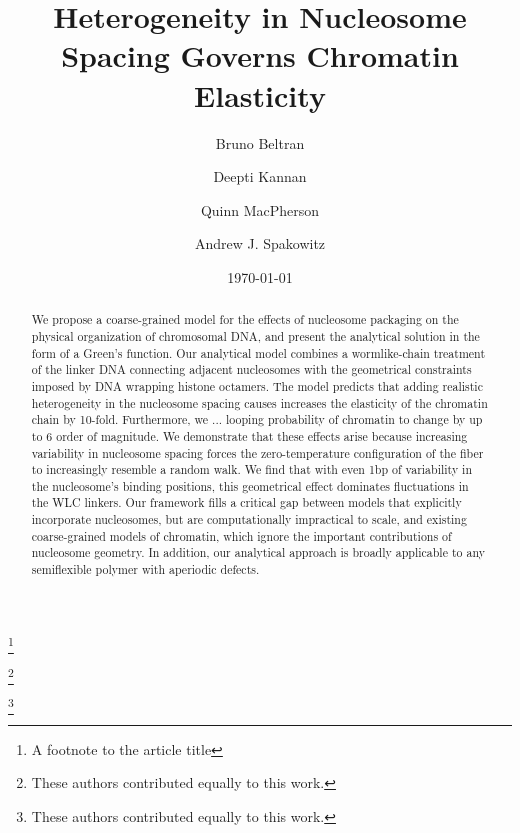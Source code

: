 \documentclass[%
 reprint,
superscriptaddress,
showpacs,preprintnumbers,
 amsmath,amssymb,
 aps,
 prl,
]{revtex4-1}
\begin{document}

\title{Heterogeneity in Nucleosome Spacing Governs Chromatin Elasticity}%
\thanks{A footnote to the article title}%

\author{Bruno Beltran}
\thanks{These authors contributed equally to this work.}%
%
\author{Deepti Kannan}%
\thanks{These authors contributed equally to this work.}%
\author{Quinn MacPherson}%
%
\author{Andrew J. Spakowitz}%
%
%
\date{\today}%

\begin{abstract}

We propose a coarse-grained model for the effects of nucleosome packaging on the
    physical organization of chromosomal DNA, and present the analytical
    solution in the form of a Green's function.
Our analytical model combines a wormlike-chain treatment of the linker DNA
    connecting adjacent nucleosomes with the geometrical constraints imposed by
    DNA wrapping histone octamers.
The model predicts that adding realistic heterogeneity in the nucleosome spacing
    causes increases the elasticity of the chromatin chain by 10-fold.
Furthermore, we ... looping probability of chromatin to change by up to 6 order of magnitude.
We demonstrate that these effects arise because increasing variability in
    nucleosome spacing forces the zero-temperature configuration of the fiber to
    increasingly resemble a random walk.
We find that with even 1bp of variability in the nucleosome's binding positions,
    this geometrical effect dominates fluctuations in the WLC linkers.
Our framework fills a critical gap between models that explicitly incorporate
    nucleosomes, but are computationally impractical to scale, and existing
    coarse-grained models of chromatin, which ignore the important contributions
    of nucleosome geometry.
In addition, our analytical approach is broadly applicable to any semiflexible
    polymer with aperiodic defects.
\end{abstract}
\end{document}
